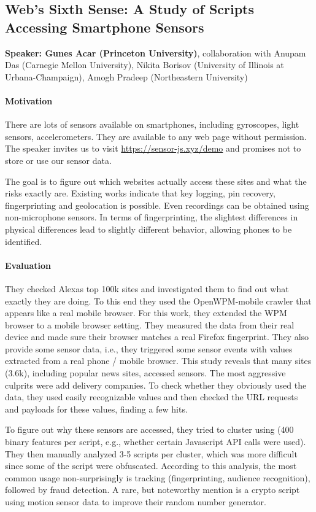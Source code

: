 \documentclass{article}
\begin{document}
\subsection{Web’s Sixth Sense: A Study of Scripts Accessing Smartphone Sensors}
\noindent\textbf{Speaker: Gunes Acar (Princeton University)}, collaboration with Anupam Das (Carnegie Mellon University), Nikita Borisov (University of Illinois at Urbana-Champaign), Amogh Pradeep (Northeastern University)

\paragraph{Motivation}
There are lots of sensors available on smartphones, including gyroscopes, light sensors, accelerometers. They are available to any web page without permission. The speaker invites us to visit \url{https://sensor-js.xyz/demo} and promises not to store or use our sensor data.

The goal is to figure out which websites actually access these sites and what the risks exactly are.
Existing works indicate that key logging, pin recovery, fingerprinting and geolocation is possible. Even recordings can be obtained using non-microphone sensors. In terms of fingerprinting, the slightest differences in physical differences lead to slightly different behavior, allowing phones to be identified.

\paragraph{Evaluation} They checked Alexas top 100k sites and investigated them to find out what exactly they are doing. To this end they used the OpenWPM-mobile crawler that appears like a real mobile browser. For this work, they extended the WPM browser to a mobile browser setting. They measured the data from their real device and made sure their browser matches a real Firefox fingerprint. They also provide some sensor data, i.e., they triggered some sensor events with values extracted from a real phone / mobile browser. This study reveals that many sites (3.6k), including popular news sites, accessed sensors. The most aggressive culprits were add delivery companies. To check whether they obviously used the data, they used easily recognizable values and then checked the URL requests and payloads for these values, finding a few hits.

To figure out why these sensors are accessed, they tried to cluster using (400 binary features per script, e.g., whether certain Javascript API calls were used). They then manually analyzed 3-5 scripts per cluster, which was more difficult since some of the script were obfuscated. According to this analysis, the most common usage non-surprisingly is tracking (fingerprinting, audience recognition), followed by fraud detection. A rare, but noteworthy mention is a crypto script using motion sensor data to improve their random number generator.
\end{document}
